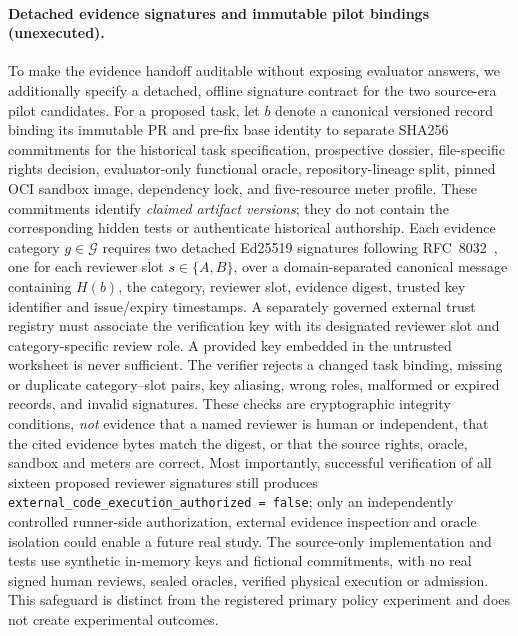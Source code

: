 \documentclass[pdflatex,sn-basic]{sn-jnl}
\begin{document}
\paragraph{Detached evidence signatures and immutable pilot bindings (unexecuted).}
To make the evidence handoff auditable without exposing evaluator
answers, we additionally specify a detached, offline signature
contract for the two source-era pilot candidates. For a proposed task,
let $b$ denote a canonical versioned record binding its immutable
PR and pre-fix base identity to separate SHA256 commitments for the
historical task specification, prospective dossier, file-specific
rights decision, evaluator-only functional oracle, repository-lineage
split, pinned OCI sandbox image, dependency lock, and five-resource
meter profile. These commitments identify \emph{claimed artifact
versions}; they do not contain the corresponding hidden tests or
authenticate historical authorship. Each evidence category
$g\in\mathcal{G}$ requires two detached Ed25519 signatures
following RFC~8032~\cite{josefsson2017eddsa},
one for each reviewer slot $s\in\{A,B\}$, over
a domain-separated canonical message containing
$H(b)$, the category, reviewer slot, evidence digest,
trusted key identifier and issue/expiry timestamps.
A separately governed external trust registry must associate
the verification key with its designated reviewer slot and
category-specific review role. A provided key embedded in the
untrusted worksheet is never sufficient. The verifier rejects
a changed task binding, missing or duplicate category--slot
pairs, key aliasing, wrong roles, malformed or expired records,
and invalid signatures. These checks are cryptographic integrity
conditions, \emph{not} evidence that a named reviewer is human
or independent, that the cited evidence bytes match the digest,
or that the source rights, oracle, sandbox and meters are correct.
Most importantly, successful verification of all sixteen proposed
reviewer signatures still produces
\texttt{external\_code\_execution\_authorized = false};
only an independently controlled runner-side authorization,
external evidence inspection and oracle isolation could enable
a future real study. The source-only implementation and tests
use synthetic in-memory keys and fictional commitments, with
no real signed human reviews, sealed oracles, verified physical
execution or admission. This safeguard is distinct from the
registered primary policy experiment and does not create
experimental outcomes.
\end{document}
